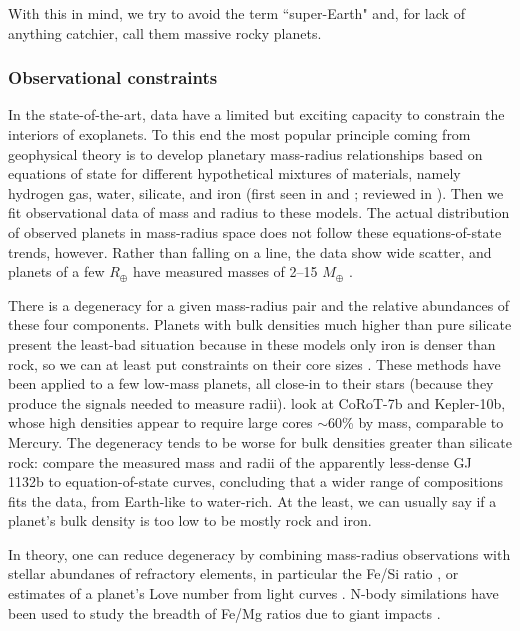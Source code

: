 With this in mind, we try to avoid the term ``super-Earth" and, for lack of anything catchier, call them massive rocky planets. 

\subsubsection{Observational constraints}

In the state-of-the-art, data have a limited but exciting capacity to constrain the interiors of exoplanets. To this end the most popular principle coming from geophysical theory is to develop planetary mass-radius relationships based on equations of state for different hypothetical mixtures of materials, namely hydrogen gas, water, silicate, and iron (first seen in \citeauthor{Seager2007} \citeyear{Seager2007} and \citeauthor{Valencia2007} \citeyear{Valencia2007}; reviewed in \citeauthor{Dorn2018} \citeyear{Dorn2018}). Then we fit observational data of mass and radius to these models. The actual distribution of observed planets in mass-radius space does not follow these equations-of-state trends, however. Rather than falling on a line, the data show wide scatter, and planets of a few $R_\oplus$ have measured masses of 2--15 $M_\oplus$ \citep{Jontof-Hutter2019}.

There is a degeneracy for a given mass-radius pair and the relative abundances of these four components\citep{Rogers2010, Zeng2016}. Planets with bulk densities much higher than pure silicate present the least-bad situation because in these models only iron is denser than rock, so we can at least put constraints on their core sizes \citep{Suissa2018}. These methods have been applied to a few low-mass planets, all close-in to their stars (because they produce the signals needed to measure radii). \citet{Wagner2012} look at CoRoT-7b and Kepler-10b, whose high densities appear to require large cores $\sim$60\% by mass, comparable to Mercury. The degeneracy tends to be worse for bulk densities greater than silicate rock: \citet{Southworth2017} compare the measured mass and radii of the apparently less-dense GJ 1132b to equation-of-state curves, concluding that a wider range of compositions fits the data, from Earth-like to water-rich. At the least, we can usually say if a planet's bulk density is too low to be mostly rock and iron.

In theory, one can reduce degeneracy by combining mass-radius observations with stellar abundanes of refractory elements, in particular the Fe/Si ratio \citep{Dorn2017, Brugger2017}, or estimates of a planet's Love number from light curves \citep{Kellermann2018}. N-body similations have been used to study the breadth of Fe/Mg ratios due to giant impacts \citep{Scora2020}.


